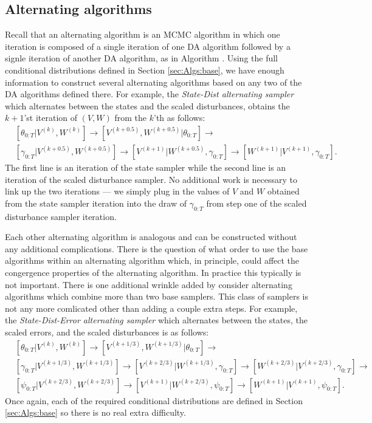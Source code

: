 \documentclass{article}
\begin{document}
\subsection{Alternating algorithms}\label{sec:Algs:alt}
Recall that an alternating algorithm is an MCMC algorithm in which one iteration is composed of a single iteration of one DA algorithm followed by a signle iteration of another DA algorithm, as in Algorithm . Using the full conditional distributions defined in Section \ref{sec:Algs:base}, we have enough information to construct several alternating algorithms based on any two of the DA algorithms defined there. For example, the {\it State-Dist alternating sampler} which alternates between the states and the scaled disturbances, obtains the $k+1$'st iteration of $(V,W)$ from the $k$'th as follows:
\begin{align*}
&[\theta_{0:T}|V^{(k)},W^{(k)}] \to [V^{(k+0.5)},W^{(k+0.5)}|\theta_{0:T}] \to\\ 
&[\gamma_{0:T}|V^{(k+0.5)},W^{(k+0.5)}] \to [V^{(k+1)}|W^{(k+0.5)},\gamma_{0:T}] \to [W^{(k+1)}|V^{(k+1)},\gamma_{0:T}].
\end{align*}
The first line is an iteration of the state sampler while the second line is an iteration of the scaled disturbance sampler. No additional work is necessary to link up the two iterations --- we simply plug in the values of $V$ and $W$ obtained from the state sampler iteration into the draw of $\gamma_{0:T}$ from step one of the scaled disturbance sampler iteration.

Each other alternating algorithm is analogous and can be constructed without any additional complications. There is the question of what order to use the base algorithms within an alternating algorithm which, in principle, could affect the congergence properties of the alternating algorithm. In practice this typically is not important. There is one additional wrinkle added by consider alternating algorithms which combine more than two base samplers. This class of samplers is not any more comlicated other than adding a couple extra steps. For example, the {\it State-Dist-Error alternating sampler} which alternates between the states, the scaled errors, and the scaled disturbances is as follows:
\begin{align*}
&[\theta_{0:T}|V^{(k)},W^{(k)}] \to [V^{(k+1/3)},W^{(k+1/3)}|\theta_{0:T}] \to\\ 
&[\gamma_{0:T}|V^{(k+1/3)},W^{(k+1/3)}] \to [V^{(k+2/3)}|W^{(k+1/3)},\gamma_{0:T}] \to [W^{(k+2/3)}|V^{(k+2/3)},\gamma_{0:T}]\to \\
&[\psi_{0:T}|V^{(k+2/3)},W^{(k+2/3)}] \to [V^{(k+1)}|W^{(k+2/3)},\psi_{0:T}] \to [W^{(k+1)}|V^{(k+1)},\psi_{0:T}].
\end{align*}
Once again, each of the required conditional distributions are defined in Section \ref{sec:Algs:base} so there is no real extra difficulty.
\end{document}
